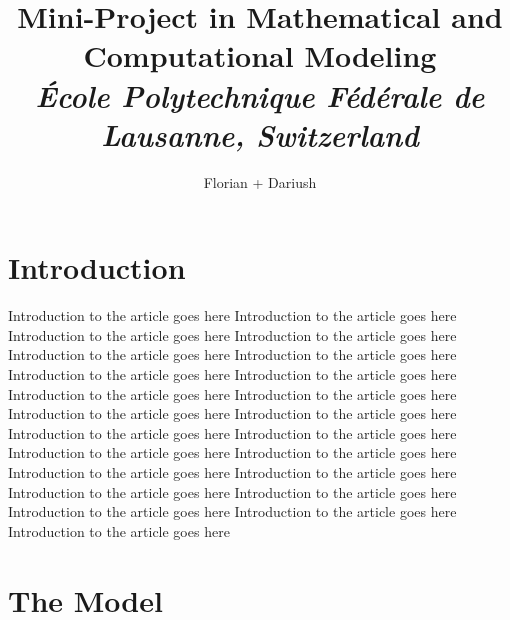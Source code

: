 \documentclass[10pt,a4paper,oneside,twocolumn]{article}
\numberwithin{equation}{section} %
\begin{document}
\title{\huge{\textbf{Mini-Project in Mathematical and Computational Modeling}}\\
	\vspace{0.5cm}
	\Large{\textit{\'Ecole Polytechnique F\'ed\'erale de Lausanne, Switzerland}}}
\author{\large{Florian + Dariush}}

\section{Introduction}
    Introduction to the article goes here    Introduction to the article goes here  Introduction to the article goes here  Introduction to the article goes here  Introduction to the article goes here  Introduction to the article goes here  Introduction to the article goes here  Introduction to the article goes here  Introduction to the article goes here  Introduction to the article goes here  Introduction to the article goes here  Introduction to the article goes here  Introduction to the article goes here  Introduction to the article goes here  Introduction to the article goes here  Introduction to the article goes here  Introduction to the article goes here  Introduction to the article goes here  Introduction to the article goes here  Introduction to the article goes here  Introduction to the article goes here  Introduction to the article goes here Introduction to the article goes here \\

\section{The Model}
\end{document}
